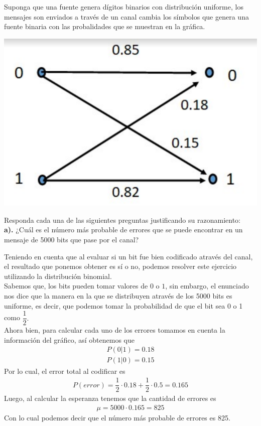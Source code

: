 
Suponga que una fuente genera dígitos binarios con distribución uniforme, los mensajes son enviados a través de un canal cambia los símbolos que genera una fuente binaria con las probalidades que se muestran en la gráfica.\\
\begin{center}
     \includegraphics[scale=0.4]{punto1.png}
    \end{center}
Responda cada una de las siguientes preguntas justificando su razonamiento:\\
\textbf{a).} ¿Cuál es el número más probable de errores que se puede encontrar en un mensaje de 5000 bits que pase por el canal?\\
\begin{sol}
   Teniendo en cuenta que al evaluar si un bit fue bien codificado através del canal, el resultado que ponemos obtener es sí o no, podemos resolver este ejercicio utilizando la distribución binomial.\\
   Sabemos que, los bits pueden tomar valores de $0$ o $1$, sin embargo, el enunciado nos dice que la manera en la que se distribuyen através de los 5000 bits es uniforme, es decir, que podemos tomar la probabilidad de que el bit sea 0 o 1 como $\dfrac{1}{2}.$ \\
   Ahora bien, para calcular cada uno de los errores tomamos en cuenta la información del gráfico, así obtenemos que
   \begin{align*}
       P(0|1)=0.18\\
       P(1|0)=0.15
   \end{align*}
Por lo cual, el error total al codificar es 
\begin{align*}
    P(error)=\dfrac{1}{2}\cdot 0.18+\dfrac{1}{2}\cdot 0.5=0.165
\end{align*}
Luego, al calcular la esperanza tenemos que la cantidad de errores es
\begin{align*}
\mu=5000\cdot 0.165=825
\end{align*}
Con lo cual podemos decir que el número más probable de errores es 825.
\end{sol}
